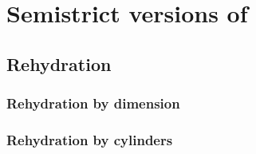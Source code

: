 \documentclass{cam-thesis}
\begin{document}
\chapter{Semistrict versions of \Catt}
\label{cha:cattsu}

\section{\Cattsu}
\label{sec:cattsu}

\section{\Cattsua}
\label{sec:cattsua}

\section{Rehydration}
\label{sec:rehydration}




\subsection{Rehydration by dimension}
\label{sec:rehydr-dimens}

\subsection{Rehydration by cylinders}
\label{sec:rehydr-cylind}



















\printbibliography
\end{document}
